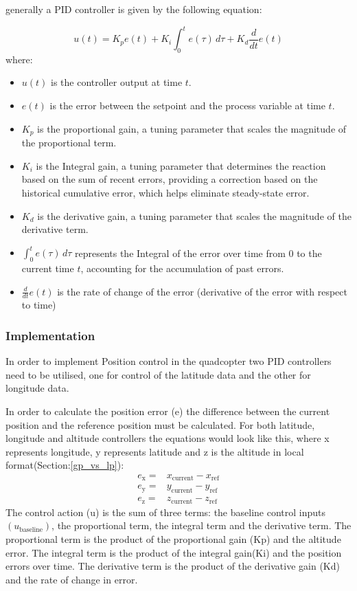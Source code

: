 \documentclass{report}
\begin{document}
generally a PID controller is given by the following equation: 

\begin{equation}
  u(t) = K_p e(t) + K_i \int_{0}^{t} e(\tau) \, d\tau + K_d \frac{d}{dt} e(t)
\end{equation}
where:
\begin{itemize}
    \item $u(t)$ is the controller output at time $t$.
    \item $e(t)$ is the error between the setpoint and the process variable at
    time $t$.
    \item $K_p$ is the proportional gain, a tuning parameter that scales the
    magnitude of the proportional term.
    \item $K_i$ is the Integral gain, a tuning parameter that determines the
    reaction based on the sum of recent errors, providing a correction based on
    the historical cumulative error, which helps eliminate steady-state error.
    \item $K_d$ is the derivative gain, a tuning parameter that scales the
    magnitude of the derivative term.
    \item $\int_{0}^{t} e(\tau) \, d\tau$ represents the Integral of the error
    over time from 0 to the current time $t$, accounting for the accumulation of
    past errors.
    \item $\frac{d}{dt} e(t)$ is the rate of change of the error (derivative of
    the error with respect to time)
\end{itemize}
\subsubsection*{Implementation}
In order to implement Position control in the quadcopter two PID controllers
need to be utilised, one for control of the latitude data and the other for
longitude data. 

In order to calculate the position error (e) the difference between the current
position and the reference position must be calculated. For both latitude, longitude and altitude controllers the equations would look like this, where x represents
longitude, y represents latitude and z is the altitude in local format(Section:\ref{gp_vs_lp}):
\begin{align}
  e_{\text{x}} =&  x_{\text{current}} - x_{\text{ref}}
  \\
  e_{\text{y}} =&  y_{\text{current}} - y_{\text{ref}}
  \\
  e_{\text{z}} =&  z_{\text{current}} - z_{\text{ref}}
\end{align}
The control action (u) is the sum of three terms: the baseline control
inputs\((u_{\text{baseline}})\), the proportional term, the integral term and
the derivative term. The proportional term is the product of the proportional
gain (Kp) and the altitude error. The integral term is the product of the
integral gain(Ki) and the position errors over time. The derivative term is the
product of the derivative gain (Kd) and the rate of change in error.
\end{document}
